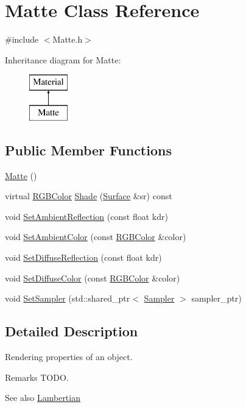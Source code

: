 \hypertarget{class_matte}{}\section{Matte Class Reference}
\label{class_matte}


{\ttfamily \#include $<$Matte.\+h$>$}

Inheritance diagram for Matte\+:\begin{figure}[H]
\begin{center}
\leavevmode
\includegraphics[height=2.000000cm]{class_matte}
\end{center}
\end{figure}
\subsection*{Public Member Functions}
\begin{DoxyCompactItemize}
\item 
\hyperlink{class_matte_a1f460cbc9dd811c509ca50b652102ac2}{Matte} ()
\item 
virtual \hyperlink{class_r_g_b_color}{R\+G\+B\+Color} \hyperlink{class_matte_a1313aabd946d45ec67a9de4fbc486f6c}{Shade} (\hyperlink{class_surface}{Surface} \&sr) const
\item 
void \hyperlink{group___materials_gad4df0e4b6f2112282b492f068faf1d72}{Set\+Ambient\+Reflection} (const float kdr)
\item 
void \hyperlink{group___materials_ga3a3fb682a6cfb419d05bf5dba9088f57}{Set\+Ambient\+Color} (const \hyperlink{class_r_g_b_color}{R\+G\+B\+Color} \&color)
\item 
void \hyperlink{group___materials_ga59c2ccdf9e80053784f5449603c7b7a3}{Set\+Diffuse\+Reflection} (const float kdr)
\item 
void \hyperlink{group___materials_ga6a82d5d8fd47aeb188380c067477e396}{Set\+Diffuse\+Color} (const \hyperlink{class_r_g_b_color}{R\+G\+B\+Color} \&color)
\item 
void \hyperlink{group___materials_ga6b42d7c8b02c61801702dc19d8e3ba5a}{Set\+Sampler} (std\+::shared\+\_\+ptr$<$ \hyperlink{class_sampler}{Sampler} $>$ sampler\+\_\+ptr)
\end{DoxyCompactItemize}


\subsection{Detailed Description}
Rendering properties of an object. \begin{DoxyRemark}{Remarks}
T\+O\+DO. 
\end{DoxyRemark}
\begin{DoxySeeAlso}{See also}
\hyperlink{class_lambertian}{Lambertian} 
\end{DoxySeeAlso}


